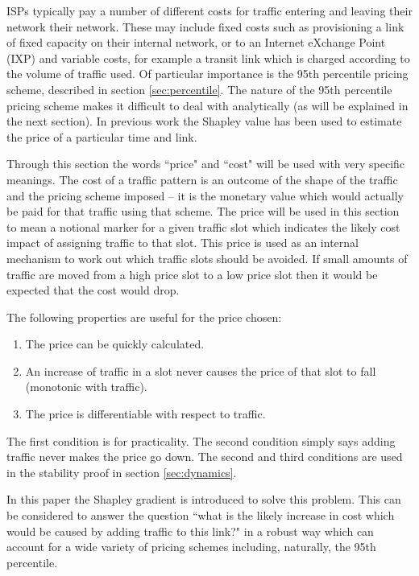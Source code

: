 ISPs typically pay a number of different costs for traffic entering
and leaving their network their network.  These may include fixed 
costs such as provisioning a link of fixed capacity on their 
internal network, or to an Internet eXchange Point (IXP) and 
variable costs, for example a transit
link which is charged according to the volume of traffic used.
Of particular importance is the 95th percentile pricing scheme,
described in section \ref{sec:percentile}.  The nature of
the 95th percentile pricing scheme makes it difficult to
deal with analytically (as will be explained in the next section).  
In previous work \cite{stanojevic2010heavy} 
the Shapley value has been used to estimate the price of a particular
time and link.  

Through this section the words ``price" and ``cost" will be used with
very specific meanings.  The cost of a traffic pattern is an outcome of
the shape of the traffic and the pricing scheme imposed -- it is the
monetary value which would actually be paid for that traffic using
that scheme.  The price
will be used in this section to mean a notional marker for a given
traffic slot which indicates the likely cost impact of assigning traffic
to that slot.  This price is used as an internal mechanism to work out
which traffic slots should be avoided.  If small amounts of traffic are
moved from a high price slot to a low price slot then it would be
expected that the cost would drop.  

The following properties are useful for the price  
chosen:
\begin{enumerate}
\item The price can be quickly calculated.
\item An increase of traffic in a slot never causes the price of
that slot to fall (monotonic with traffic).
\item The price is differentiable with respect to traffic.
\end{enumerate}
The first condition is for practicality.  The second condition simply
says adding traffic never makes the price go down.
The second and third conditions are used in the stability proof in section 
\ref{sec:dynamics}.

In this paper the Shapley
gradient is introduced to solve this problem.  
This can be considered to answer the question
``what is the likely increase in cost which would be caused by adding
traffic to this link?" in a robust way which can account for a wide
variety of pricing schemes
including, naturally, the 95th percentile.

